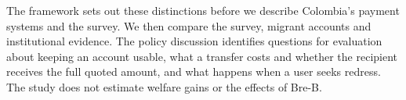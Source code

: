 The framework sets out these distinctions before we describe Colombia's payment systems and the survey. We then compare the survey, migrant accounts and institutional evidence. The policy discussion identifies questions for evaluation about keeping an account usable, what a transfer costs and whether the recipient receives the full quoted amount, and what happens when a user seeks redress. The study does not estimate welfare gains or the effects of Bre-B.

